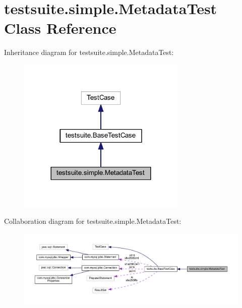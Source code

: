 \hypertarget{classtestsuite_1_1simple_1_1_metadata_test}{}\section{testsuite.\+simple.\+Metadata\+Test Class Reference}
\label{classtestsuite_1_1simple_1_1_metadata_test}


Inheritance diagram for testsuite.\+simple.\+Metadata\+Test\+:
\nopagebreak
\begin{figure}[H]
\begin{center}
\leavevmode
\includegraphics[width=228pt]{classtestsuite_1_1simple_1_1_metadata_test__inherit__graph}
\end{center}
\end{figure}


Collaboration diagram for testsuite.\+simple.\+Metadata\+Test\+:
\nopagebreak
\begin{figure}[H]
\begin{center}
\leavevmode
\includegraphics[width=350pt]{classtestsuite_1_1simple_1_1_metadata_test__coll__graph}
\end{center}
\end{figure}
